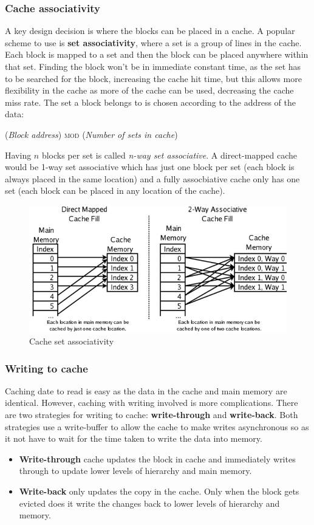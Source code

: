 \documentclass[11pt]{article}
\begin{document}
\subsubsection{Cache associativity}
A key design decision is where the blocks can be placed in a cache. A popular scheme to use is \textbf{set associativity}, where a set is a group of lines in the cache. Each block is mapped to a set and then the block can be placed anywhere within that set. Finding the block won't be in immediate constant time, as the set has to be searched for the block, increasing the cache hit time, but this allows more flexibility in the cache as more of the cache can be used, decreasing the cache miss rate. The set a block belongs to is chosen according to the address of the data:
\begin{center}
(\textit{Block address}) \textsc{mod} (\textit{Number of sets in cache})
\end{center}
\noindent
Having $n$ blocks per set is called \textit{n-way set associative}. A direct-mapped cache would be 1-way set associative which has just one block per set (each block is always placed in the same location) and a fully assocbiative cache only has one set (each block can be placed in any location of the cache).
\begin{figure}[H]
\centering
\includegraphics[width=1\textwidth, keepaspectratio]{imgs/cache-associativity.png}
\caption{Cache set associativity}
\end{figure}
\subsubsection{Writing to cache}
Caching date to read is easy as the data in the cache and main memory are identical. However, caching with writing involved is more complications. There are two strategies for writing to cache: \textbf{write-through} and \textbf{write-back}. Both strategies use a write-buffer to allow the cache to make writes asynchronous so as it not have to wait for the time taken to write the data into memory.
\begin{itemize}
\item \textbf{Write-through} cache updates the block in cache and immediately writes through to update lower levels of hierarchy and main memory.
\item \textbf{Write-back} only updates the copy in the cache. Only when the block gets evicted does it write the changes back to lower levels of hierarchy and memory. 
\end{itemize}
\end{document}
